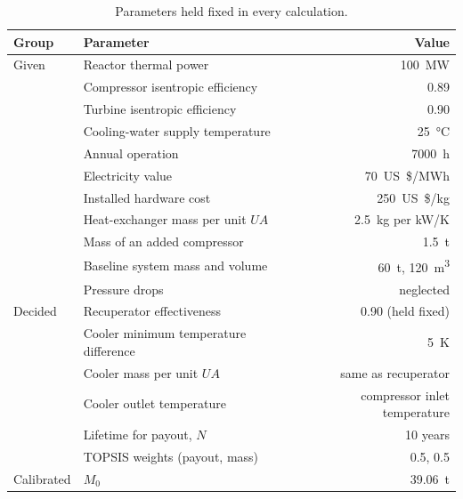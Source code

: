 \begin{table}[!htbp]\centering\small
\begin{tabular}{llr}
\toprule
Group & Parameter & Value\\
\midrule
Given & Reactor thermal power & \SI{100}{MW}\\
 & Compressor isentropic efficiency & 0.89\\
 & Turbine isentropic efficiency & 0.90\\
 & Cooling-water supply temperature & \SI{25}{\celsius}\\
 & Annual operation & \SI{7000}{h}\\
 & Electricity value & \SI{70}{US\$/MWh}\\
 & Installed hardware cost & \SI{250}{US\$/kg}\\
 & Heat-exchanger mass per unit $UA$ & \SI{2.5}{kg} per \si{kW/K}\\
 & Mass of an added compressor & \SI{1.5}{t}\\
 & Baseline system mass and volume & \SI{60}{t}, \SI{120}{m^3}\\
 & Pressure drops & neglected\\
\midrule
Decided & Recuperator effectiveness & 0.90 (held fixed)\\
& Cooler minimum temperature difference & \SI{5}{K}\\
 & Cooler mass per unit $UA$ & same as recuperator\\
 & Cooler outlet temperature & compressor inlet temperature\\
 & Lifetime for payout, $N$ & 10 years\\
 & TOPSIS weights (payout, mass) & 0.5, 0.5\\
\midrule
Calibrated & $M_0$ & \SI{39.06}{t}\\
\bottomrule
\end{tabular}
\caption{Parameters held fixed in every calculation.}\label{tab:config}
\end{table}

